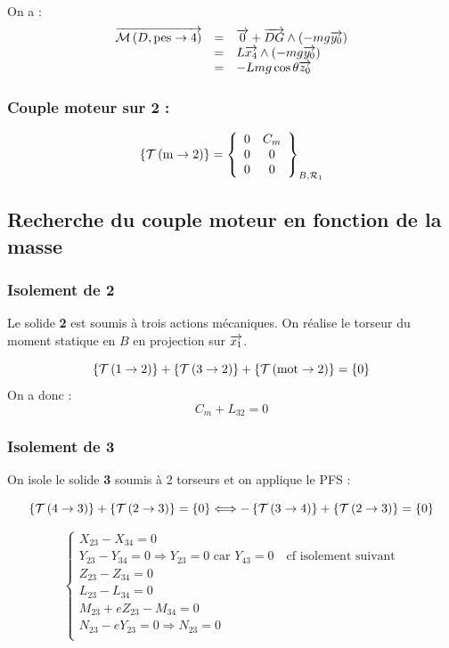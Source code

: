 \documentclass[10pt,fleqn]{article} %
\begin{document}
On a :
$$
\begin{array}{lcl}
\vectm{D}{\text{pes}}{4} &=& \vect{0} + \vect{DG} \wedge \left( -mg\vect{y_0}\right) \\
&=& L\vect{x_4} \wedge \left( -mg\vect{y_0}\right) \\
&=& -Lmg \cos \theta \vect{z_0} \\
\end{array}
$$


\subsubsection*{Couple moteur sur 2 :}
$$
\torseurstat{T}{\text{m}}{2}=\torseurcol{0}{0}{0}{C_m}{0}{0}{B,\mathcal{R}_1}
$$

\subsection{Recherche du couple moteur en fonction de la masse}
\subsubsection*{Isolement de 2}
Le solide \textbf{2} est soumis à trois actions mécaniques. On réalise le torseur du moment statique en $B$ en projection sur $\vect{x_1}$. 

$$
\torseurstat{T}{1}{2} + \torseurstat{T}{3}{2} + \torseurstat{T}{\text{mot}}{2}  =\{0\} 
$$
On a donc : 
$$
C_m + L_{32}=0
$$





\subsubsection*{Isolement de 3}
On isole le solide \textbf{3} soumis à 2 torseurs et on applique le PFS :

$$
\torseurstat{T}{4}{3} + \torseurstat{T}{2}{3} =\{0\} \Longleftrightarrow 
-\torseurstat{T}{3}{4} + \torseurstat{T}{2}{3} =\{0\} 
$$

$$
\left\{
\begin{array}{l}
X_{23} - X_{34}=0\\
Y_{23} - Y_{34}=0 \Rightarrow  Y_{23} = 0 \text{ car } Y_{43} = 0 \quad \text{cf isolement suivant}\\
Z_{23} - Z_{34}=0\\
L_{23} - L_{34}=0\\
M_{23}+eZ_{23} - M_{34} =0\\
N_{23}-eY_{23} =0 \Rightarrow  N_{23} = 0 \\
\end{array}
\right.
$$
\end{document}

